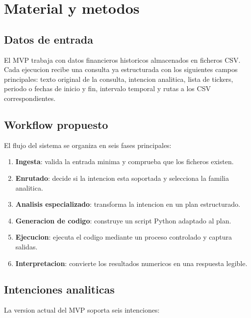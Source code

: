 \chapter{Material y metodos}

\section{Datos de entrada}

El MVP trabaja con datos financieros historicos almacenados en ficheros CSV. Cada ejecucion recibe una consulta ya estructurada con los siguientes campos principales: texto original de la consulta, intencion analitica, lista de tickers, periodo o fechas de inicio y fin, intervalo temporal y rutas a los CSV correspondientes.

\section{Workflow propuesto}

El flujo del sistema se organiza en seis fases principales:

\begin{enumerate}
    \item \textbf{Ingesta}: valida la entrada minima y comprueba que los ficheros existen.
    \item \textbf{Enrutado}: decide si la intencion esta soportada y selecciona la familia analitica.
    \item \textbf{Analisis especializado}: transforma la intencion en un plan estructurado.
    \item \textbf{Generacion de codigo}: construye un script Python adaptado al plan.
    \item \textbf{Ejecucion}: ejecuta el codigo mediante un proceso controlado y captura salidas.
    \item \textbf{Interpretacion}: convierte los resultados numericos en una respuesta legible.
\end{enumerate}

\section{Intenciones analiticas}

La version actual del MVP soporta seis intenciones:

